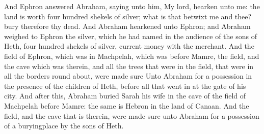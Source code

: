 \begin{biblechapter}
\verse And Ephron answered Abraham, saying unto him,
\verse My lord, hearken unto me: the land is worth four hundred shekels of silver; what is that betwixt me and thee? bury therefore thy dead.
\verse And Abraham hearkened unto Ephron; and Abraham weighed to Ephron the silver, which he had named in the audience of the sons of Heth, four hundred shekels of silver, current money with the merchant.
\verse And the field of Ephron, which was in Machpelah, which was before Mamre, the field, and the cave which was therein, and all the trees that were in the field, that were in all the borders round about, were made sure
\verse Unto Abraham for a possession in the presence of the children of Heth, before all that went in at the gate of his city.
\verse And after this, Abraham buried Sarah his wife in the cave of the field of Machpelah before Mamre: the same is Hebron in the land of Canaan.
\verse And the field, and the cave that is therein, were made sure unto Abraham for a possession of a buryingplace by the sons of Heth.
\end{biblechapter}

